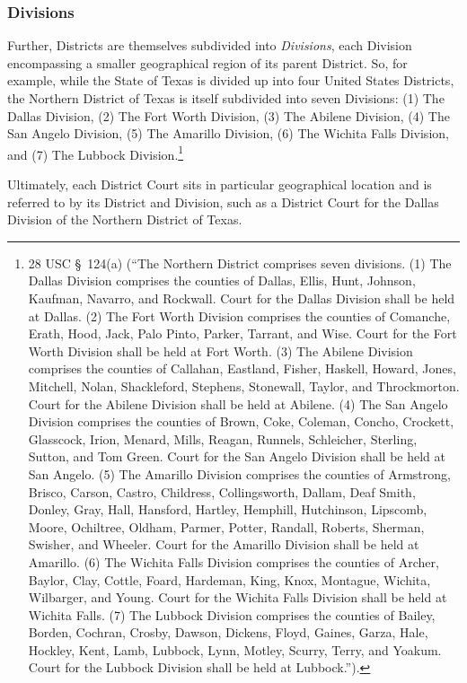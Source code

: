 \subsubsection{Divisions}
Further, Districts are themselves subdivided into \textit{Divisions}, each Division encompassing a smaller geographical region of its parent District.  So, for example, while the State of Texas is divided up into four United States Districts, the Northern District of Texas is itself subdivided into seven Divisions: (1) The Dallas Division, (2) The Fort Worth Division, (3) The Abilene Division, (4) The San Angelo Division, (5) The Amarillo Division, (6) The Wichita Falls Division, and (7) The Lubbock Division.\footnote{28 USC \S\ 124(a) (``The Northern District comprises seven divisions.  (1) The Dallas Division comprises the counties of Dallas, Ellis, Hunt, Johnson, Kaufman, Navarro, and Rockwall.  Court for the Dallas Division shall be held at Dallas.  (2) The Fort Worth Division comprises the counties of Comanche, Erath, Hood, Jack, Palo Pinto, Parker, Tarrant, and Wise.  Court for the Fort Worth Division shall be held at Fort Worth.  (3) The Abilene Division comprises the counties of Callahan, Eastland, Fisher, Haskell, Howard, Jones, Mitchell, Nolan, Shackleford, Stephens, Stonewall, Taylor, and Throckmorton.  Court for the Abilene Division shall be held at Abilene.  (4) The San Angelo Division comprises the counties of Brown, Coke, Coleman, Concho, Crockett, Glasscock, Irion, Menard, Mills, Reagan, Runnels, Schleicher, Sterling, Sutton, and Tom Green.  Court for the San Angelo Division shall be held at San Angelo.  (5) The Amarillo Division comprises the counties of Armstrong, Brisco, Carson, Castro, Childress, Collingsworth, Dallam, Deaf Smith, Donley, Gray, Hall, Hansford, Hartley, Hemphill, Hutchinson, Lipscomb, Moore, Ochiltree, Oldham, Parmer, Potter, Randall, Roberts, Sherman, Swisher, and Wheeler.  Court for the Amarillo Division shall be held at Amarillo.  (6) The Wichita Falls Division comprises the counties of Archer, Baylor, Clay, Cottle, Foard, Hardeman, King, Knox, Montague, Wichita, Wilbarger, and Young.  Court for the Wichita Falls Division shall be held at Wichita Falls.  (7) The Lubbock Division comprises the counties of Bailey, Borden, Cochran, Crosby, Dawson, Dickens, Floyd, Gaines, Garza, Hale, Hockley, Kent, Lamb, Lubbock, Lynn, Motley, Scurry, Terry, and Yoakum.  Court for the Lubbock Division shall be held at Lubbock.'').}

Ultimately, each District Court sits in particular geographical location and is referred to by its District and Division, such as a District Court for the Dallas Division of the Northern District of Texas.

